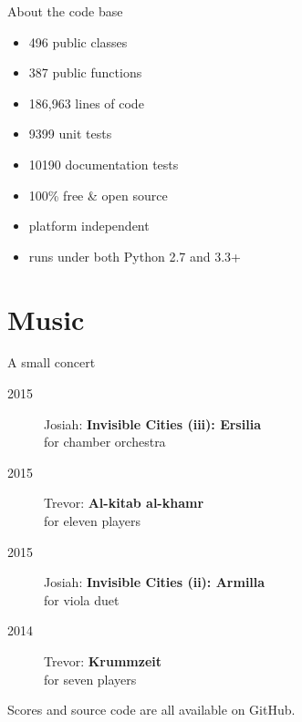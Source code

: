 \documentclass[10pt]{beamer}
\begin{document}
\begin{frame}{About the code base}

    \begin{itemize}
        \item 496 public classes
        \item 387 public functions
        \item 186,963 lines of code
        \item 9399 unit tests
        \item 10190 documentation tests
        \item 100\% free \& open source
        \item platform independent
        \item runs under both Python 2.7 and 3.3+
    \end{itemize}

\end{frame}

\section{Music}

\begin{frame}{A small concert}
    \begin{description}
        \item[2015] Josiah: \textbf{Invisible Cities (iii): Ersilia} \\
            for chamber orchestra
        \item[2015] Trevor: \textbf{Al-kitab al-khamr} \\
            for eleven players
        \item[2015] Josiah: \textbf{Invisible Cities (ii): Armilla} \\
            for viola duet
        \item[2014] Trevor: \textbf{Krummzeit} \\
            for seven players
    \end{description}
    \begin{center}
        Scores and source code are all available on GitHub.
    \end{center}
\end{frame}
\end{document}
